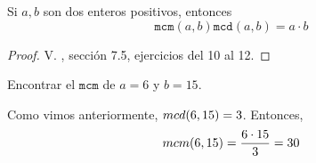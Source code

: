 	\begin{prop}
		\label{prop:mcm}
		Si $a,b$ son dos enteros positivos, entonces
		$$
		\texttt{mcm}(a,b)\texttt{mcd}(a,b)= a\cdot b
		$$
	\end{prop}
	\begin{proof}
		V. \cite{cardenas1973algebra}, sección 7.5, ejercicios del 10 al 12. 
	\end{proof}
	\begin{problema}
		\label{exmp:mcm}
		Encontrar el $\texttt{mcm}$ de $a=6$ y $b=15.$
	\end{problema}
	\begin{solucion}
		Como vimos anteriormente, $ mcd(6,15)=3 $. Entonces, 
		\[ mcm(6,15)=\dfrac{6\cdot15}{3}= 30 \]
	\end{solucion}

